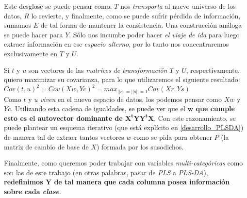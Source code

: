 Este desglose se puede pensar como: $T$ nos \textit{transporta} al nuevo universo de los datos, $R$ lo revierte, y finalmente, como se puede sufrir p\'erdida de informaci\'on, sumamos $E$ de tal forma de mantener la consistencia. Una construcci\'on an\'aloga se puede hacer para $Y$. S\'olo nos incumbe poder hacer \textit{el viaje de ida} para luego extraer informaci\'on en ese \textit{espacio alterno}, por lo tanto nos concentraremos exclusivamente en $T$ y $U$.

Si $t$ y $u$ son vectores de las \textit{matrices de transformaci\'on} $T$ y $U$, respectivamente, quiero maximizar su covarianza, para lo que utilizaremos el siguiente resultado: \\


$Cov(t, u)^{2} = Cov(Xw, Yc)^{2} = max_{\vert \vert r \vert \vert = \vert \vert s \vert \vert = 1} Cov(Xr, Ys)$ \\

Como $t$ y $u$ \textit{viven} en el nuevo espacio de datos, los podemos pensar como $Xw$ y $Yc$. Utilizando esta cadena de igualdades, se puede ver que el \textbf{$\mathbf{w}$ que cumple esto es el autovector dominante de $\mathbf{X^{t}YY^{t}X}$}. Con este razonamiento, se puede plantear un esquema iterativo (que est\'a expl\'icito en \ref{desarrollo_PLSDA}) de manera tal de extraer tantos vectores $w$ como se pida para obtener $P$ (la matriz de cambio de base de $X$) formada por los susodichos.

Finalmente, como queremos poder trabajar con variables \textit{multi-categ\'oricas} como son las de este trabajo (en otras palabras, pasar de \textit{PLS} a \textit{PLS-DA}), \textbf{redefinimos $\mathbf{Y}$ de tal manera que cada columna posea informaci\'on sobre cada \textit{clase}}.